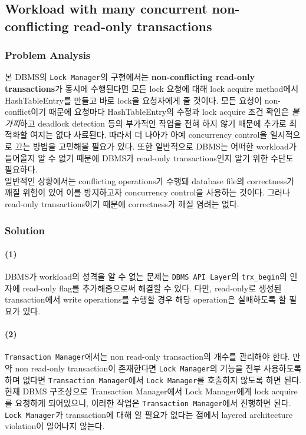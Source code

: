 \documentclass[main.tex]{subfiles}
\begin{document}
\subsection{Workload with many concurrent non-conflicting read-only transactions}

\subsubsection{Problem Analysis}
본 DBMS의 \texttt{Lock Manager}의 구현에서는 \textbf{non-conflicting read-only transactions}가 동시에 수행된다면 
모든 lock 요청에 대해 lock acquire method에서 HashTableEntry를 만들고 바로 lock을 요청자에게 줄 것이다.
모든 요청이 non-conflict이기 때문에 요청마다 HashTableEntry의 수정과 lock acquire 조건 확인은 \emph{불가피}하고 deadlock detection 등의 부가적인 작업을 전혀 하지 않기 때문에
추가로 최적화할 여지는 없다 사료된다. 따라서 더 나아가 아예 concurrency control을 일시적으로 끄는 방법을 고민해볼 필요가 있다.
또한 일반적으로 DBMS는 어떠한 workload가 들어올지 알 수 없기 때문에 DBMS가 read-only transactions인지 알기 위한 수단도 필요하다.
\\

일반적인 상황에서는 conflicting operations가 수행돼 database file의 correctness가 깨질 위험이 있어
이를 방지하고자 concurrency control을 사용하는 것이다. 그러나 read-only transactions이기 때문에 correctness가 깨질 염려는 없다.

\subsubsection{Solution}
\paragraph{(1)}
DBMS가 workload의 성격을 알 수 없는 문제는 \texttt{DBMS API Layer}의 \texttt{trx\_begin}의 인자에 read-only flag를 추가해줌으로써 해결할 수 있다.
다만, read-only로 생성된 transaction에서 write operations를 수행할 경우 해당 operation은 실패하도록 할 필요가 있다.

\paragraph{(2)}
\texttt{Transaction Manager}에서는 non read-only transaction의 개수를 관리해야 한다. 만약 non read-only transaction이 존재한다면 \texttt{Lock Manager}의 기능을 전부 사용하도록 하며
없다면 \texttt{Transaction Manager}에서 \texttt{Lock Manager}를 호출하지 않도록 하면 된다.
현재 DBMS 구조상으로 Transaction Manager에서 Lock Manager에게 lock acquire를 요청하게 되어있으니, 이러한 작업은 \texttt{Transaction Manager}에서 진행하면 된다.
\texttt{Lock Manager}가 transaction에 대해 알 필요가 없다는 점에서 layered architecture violation이 일어나지 않는다.
\\
\end{document}
